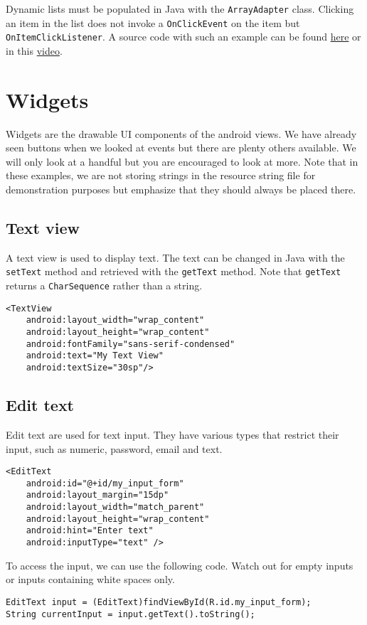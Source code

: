 Dynamic lists must be populated in Java with the \texttt{ArrayAdapter} class. Clicking an item in the list does not invoke a \texttt{OnClickEvent} on the item but \texttt{OnItemClickListener}. A source code with such an example can be found \href{https://github.com/JonSteinn/AndroidDevelopment/tree/master/examples/lab1/list}{here} or in this \href{TODO}{video}.

\section{Widgets}
Widgets are the drawable UI components of the android views. We have already seen buttons when we looked at events but there are plenty others available. We will only look at a handful but you are encouraged to look at more. Note that in these examples, we are not storing strings in the resource string file for demonstration purposes but emphasize that they should always be placed there.

\subsection{Text view}
A text view is used to display text. The text can be changed in Java with the \texttt{setText} method and retrieved with the \texttt{getText} method. Note that \texttt{getText} returns a \texttt{CharSequence} rather than a string.
\begin{lstlisting}[style=A_XML]
<TextView
    android:layout_width="wrap_content"
    android:layout_height="wrap_content"
    android:fontFamily="sans-serif-condensed"
    android:text="My Text View"
    android:textSize="30sp"/>
\end{lstlisting}

\subsection{Edit text}
Edit text are used for text input. They have various types that restrict their input, such as numeric, password, email and text. 
\begin{lstlisting}[style=A_XML, caption={Edit text declaration}, label = {listing:edittext}]
<EditText
    android:id="@+id/my_input_form"
    android:layout_margin="15dp"
    android:layout_width="match_parent"
    android:layout_height="wrap_content"
    android:hint="Enter text"
    android:inputType="text" />
\end{lstlisting}
To access the input, we can use the following code. Watch out for empty inputs or inputs containing white spaces only.
\begin{lstlisting}[style=A_Java]
EditText input = (EditText)findViewById(R.id.my_input_form);
String currentInput = input.getText().toString();
\end{lstlisting}

